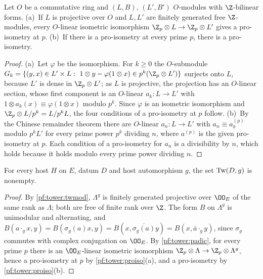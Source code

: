 \begin{lemma}\label{pf:tower:proiso}
Let $O$ be a commutative ring and $(L,B)$, $(L',B')$ $O$-modules with $\Z$-bilinear forms.
(a)~If $L$ is projective over $O$ and $L,L'$ are finitely generated free $\Z$-modules, every $O$-linear isometric isomorphism
$\Z_p\otimes L\to\Z_p\otimes L'$ gives a pro-isometry at $p$.
(b)~If there is a pro-isometry at every prime $p$, there is a pro-isometry.
\end{lemma}

\begin{proof}
(a)~Let $\varphi$ be the isomorphism. For $k\ge0$ the $O$-submodule
$G_k=\{(y,x)\in L'\times L:\ 1\otimes y-\varphi(1\otimes x)\in p^k(\Z_p\otimes L')\}$ surjects onto $L$, because $L'$ is dense in
$\Z_p\otimes L'$; as $L$ is projective, the projection has an $O$-linear section, whose first component is an $O$-linear
$a_k\colon L\to L'$ with $1\otimes a_k(x)\equiv\varphi(1\otimes x)$ modulo $p^k$. Since $\varphi$ is an isometric isomorphism and
$\Z_p\otimes L/p^k=L/p^kL$, the four conditions of a pro-isometry at $p$ follow.
(b)~By the Chinese remainder theorem there are $O$-linear $a_n\colon L\to L'$ with $a_n\equiv a^{(p)}_k$ modulo $p^kL'$ for every
prime power $p^k$ dividing $n$, where $a^{(p)}$ is the given pro-isometry at $p$. Each condition of a pro-isometry for $a_n$
is a divisibility by $n$, which holds because it holds modulo every prime power dividing $n$.
\end{proof}

\begin{theorem}\label{pf:tower:twiso}
For every host $H$ on $E$, datum $D$ and host automorphism $g$, the set $\mathrm{Tw}(D,g)$ is nonempty.
\end{theorem}

\begin{proof}
By \cref{pf:tower:twmod}, $\Lambda^g$ is finitely generated projective over $\OO_E$ of the same rank as $\Lambda$; both are free of
finite rank over $\Z$. The form $B$ on $\Lambda^g$ is unimodular and alternating, and $B(a\cdot_gx,y)=B(\sigma_g(a)x,y)
=B(x,\overline{\sigma_g(a)}y)=B(x,\bar a\cdot_gy)$, since $\sigma_g$ commutes with complex conjugation on $\OO_E$. By
\cref{pf:tower:padic}, for every prime $p$ there is an $\OO_E$-linear isometric isomorphism
$\Z_p\otimes\Lambda\to\Z_p\otimes\Lambda^g$, hence a pro-isometry at $p$ by \cref{pf:tower:proiso}(a), and a pro-isometry by
\cref{pf:tower:proiso}(b).
\end{proof}


